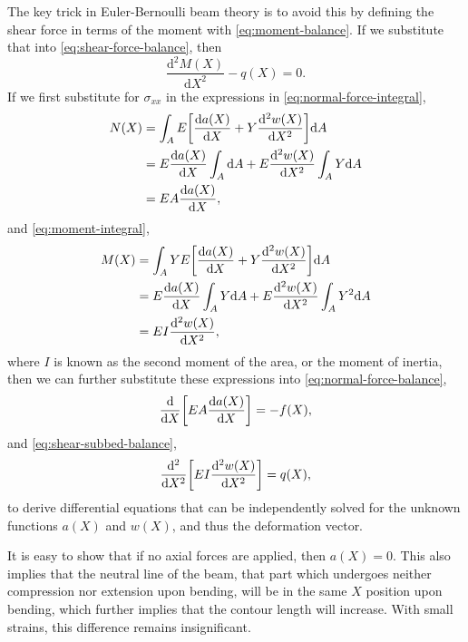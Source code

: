 The key trick in Euler-Bernoulli beam theory is to avoid this by defining the shear force in terms of the moment with \cref{eq:moment-balance}.
If we substitute that into \cref{eq:shear-force-balance}, then
\begin{equation}
    \frac{\mathrm{d}^{2} M(X)}{\mathrm{d} X^{2}} - q(X) = 0. \label{eq:shear-subbed-balance}
\end{equation}
If we first substitute for $\sigma_{xx}$ in the expressions in \cref{eq:normal-force-integral},
\begin{align}
    N(X) &= \int_{A} E \mleft[ \frac{\mathrm{d} a(X)}{\mathrm{d} X} + Y \frac{\mathrm{d}^{2} w(X)}{\mathrm{d} X^{2}} \mright] \mathrm{d} A \nonumber\\
         &= E \frac{\mathrm{d} a(X)}{\mathrm{d} X} \int_{A} \mathrm{d} A + E \frac{\mathrm{d}^{2} w(X)}{\mathrm{d} X^{2}} \int_{A} Y \mathrm{d} A \nonumber\\
         &= EA \frac{\mathrm{d} a(X)}{\mathrm{d} X},
\end{align}
and \cref{eq:moment-integral},
\begin{align}
    M(X) &= \int_{A} Y E \mleft[ \frac{\mathrm{d} a(X)}{\mathrm{d} X} + Y \frac{\mathrm{d}^{2} w(X)}{\mathrm{d} X^{2}} \mright] \mathrm{d} A \nonumber\\
         &= E \frac{\mathrm{d} a(X)}{\mathrm{d} X} \int_{A} Y \mathrm{d} A + E \frac{\mathrm{d}^{2} w(X)}{\mathrm{d} X^{2}} \int_{A} Y^{2} \mathrm{d} A \nonumber\\
         &= E I \frac{\mathrm{d}^{2} w(X)}{\mathrm{d} X^{2}},
\end{align}
where $I$ is known as the second moment of the area, or the moment of inertia, then we can further substitute these expressions into \cref{eq:normal-force-balance},
\begin{equation}
    \frac{\mathrm{d}}{\mathrm{d} X} \mleft[ E A \frac{\mathrm{d} a(X)}{\mathrm{d} X} \mright] = -f(X),
\end{equation}
and \cref{eq:shear-subbed-balance},
\begin{equation}
    \frac{\mathrm{d}^{2}}{\mathrm{d} X^{2}} \mleft[ E I \frac{\mathrm{d}^{2} w(X)}{\mathrm{d} X^{2}} \mright] = q(X),
\end{equation}
to derive differential equations that can be independently solved for the unknown functions $a(X)$ and $w(X)$, and thus the deformation vector.

It is easy to show that if no axial forces are applied, then $a(X) = 0$.
This also implies that the neutral line of the beam, that part which undergoes neither compression nor extension upon bending, will be in the same $X$ position upon bending, which further implies that the contour length will increase.
With small strains, this difference remains insignificant.

